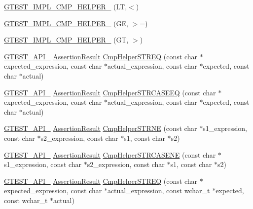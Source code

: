 \begin{DoxyCompactItemize}
\hyperlink{namespacetesting_1_1internal_aabcbff15eac496f8487699d19f42c274}{G\+T\+E\+S\+T\+\_\+\+I\+M\+P\+L\+\_\+\+C\+M\+P\+\_\+\+H\+E\+L\+P\+E\+R\+\_\+} (L\+T,$<$)
\item 
\hyperlink{namespacetesting_1_1internal_af969886067930ce70f6405cd5aa8b06b}{G\+T\+E\+S\+T\+\_\+\+I\+M\+P\+L\+\_\+\+C\+M\+P\+\_\+\+H\+E\+L\+P\+E\+R\+\_\+} (G\+E, $>$=)
\item 
\hyperlink{namespacetesting_1_1internal_a7fdb4fc164db83c51dfad17640bfeae9}{G\+T\+E\+S\+T\+\_\+\+I\+M\+P\+L\+\_\+\+C\+M\+P\+\_\+\+H\+E\+L\+P\+E\+R\+\_\+} (G\+T, $>$)
\item 
\hyperlink{gtest-port_8h_aa73be6f0ba4a7456180a94904ce17790}{G\+T\+E\+S\+T\+\_\+\+A\+P\+I\+\_\+} \hyperlink{classtesting_1_1_assertion_result}{Assertion\+Result} \hyperlink{namespacetesting_1_1internal_a8621c45bf8d0c06ea0dda6f8cdbc2c6b}{Cmp\+Helper\+S\+T\+R\+E\+Q} (const char $\ast$expected\+\_\+expression, const char $\ast$actual\+\_\+expression, const char $\ast$expected, const char $\ast$actual)
\item 
\hyperlink{gtest-port_8h_aa73be6f0ba4a7456180a94904ce17790}{G\+T\+E\+S\+T\+\_\+\+A\+P\+I\+\_\+} \hyperlink{classtesting_1_1_assertion_result}{Assertion\+Result} \hyperlink{namespacetesting_1_1internal_a911fceccafc659cf4b564c88634803bf}{Cmp\+Helper\+S\+T\+R\+C\+A\+S\+E\+E\+Q} (const char $\ast$expected\+\_\+expression, const char $\ast$actual\+\_\+expression, const char $\ast$expected, const char $\ast$actual)
\item 
\hyperlink{gtest-port_8h_aa73be6f0ba4a7456180a94904ce17790}{G\+T\+E\+S\+T\+\_\+\+A\+P\+I\+\_\+} \hyperlink{classtesting_1_1_assertion_result}{Assertion\+Result} \hyperlink{namespacetesting_1_1internal_a6b485231a046ff760844a0321c04870b}{Cmp\+Helper\+S\+T\+R\+N\+E} (const char $\ast$s1\+\_\+expression, const char $\ast$s2\+\_\+expression, const char $\ast$s1, const char $\ast$s2)
\item 
\hyperlink{gtest-port_8h_aa73be6f0ba4a7456180a94904ce17790}{G\+T\+E\+S\+T\+\_\+\+A\+P\+I\+\_\+} \hyperlink{classtesting_1_1_assertion_result}{Assertion\+Result} \hyperlink{namespacetesting_1_1internal_a5f74b933606b0a742cd5a8ad2d7087e0}{Cmp\+Helper\+S\+T\+R\+C\+A\+S\+E\+N\+E} (const char $\ast$s1\+\_\+expression, const char $\ast$s2\+\_\+expression, const char $\ast$s1, const char $\ast$s2)
\item 
\hyperlink{gtest-port_8h_aa73be6f0ba4a7456180a94904ce17790}{G\+T\+E\+S\+T\+\_\+\+A\+P\+I\+\_\+} \hyperlink{classtesting_1_1_assertion_result}{Assertion\+Result} \hyperlink{namespacetesting_1_1internal_ae4a6a76bd9be0d1d20b35bac9fe4eb71}{Cmp\+Helper\+S\+T\+R\+E\+Q} (const char $\ast$expected\+\_\+expression, const char $\ast$actual\+\_\+expression, const wchar\+\_\+t $\ast$expected, const wchar\+\_\+t $\ast$actual)

\end{DoxyCompactItemize}
